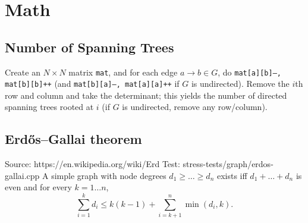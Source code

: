 \section{Math}
	\subsection{Number of Spanning Trees}
		Create an $N\times N$ matrix \texttt{mat}, and for each edge $a \rightarrow b \in G$, do
		\texttt{mat[a][b]--, mat[b][b]++} (and \texttt{mat[b][a]--, mat[a][a]++} if $G$ is undirected).
		Remove the $i$th row and column and take the determinant; this yields the number of directed spanning trees rooted at $i$
		(if $G$ is undirected, remove any row/column).

	\subsection{Erdős–Gallai theorem}
		Source: https://en.wikipedia.org/wiki/Erd%
		Test: stress-tests/graph/erdos-gallai.cpp
		A simple graph with node degrees $d_1 \ge \dots \ge d_n$ exists iff $d_1 + \dots + d_n$ is even and for every $k = 1\dots n$,
		\[ \sum _{i=1}^{k}d_{i}\leq k(k-1)+\sum _{i=k+1}^{n}\min(d_{i},k). \]
